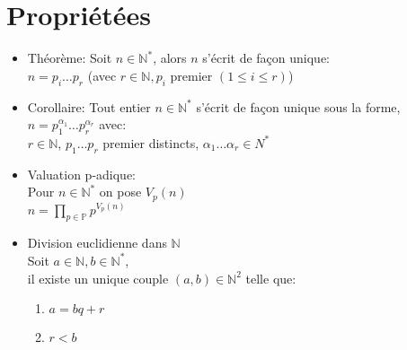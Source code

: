 \documentclass[fleqn]{article}
\begin{document}
\section{Propri\'et\'ees}
\begin{itemize}
	\item Th\'eor\`eme: Soit $n \in \mathbb{N}^*$, alors $n$ s'\'ecrit de fa\c{c}on unique: \\
		$n = p_i \ldots p_r$ (avec $r \in \mathbb{N}, p_i$ premier $(1 \leq i \leq r)$)
	\item Corollaire: Tout entier $n \in \mathbb{N}^*$ s'\'ecrit de fa\c{c}on unique sous la forme, \\
		$n = p_1^{\alpha_1} \ldots p_r^{\alpha_r}$ avec: \\
		$r \in \mathbb{N}$, $p_1 \ldots p_r$ premier distincts, $\alpha_1 \ldots \alpha_r \in {N}^*$
	\item Valuation p-adique: \\
		Pour $n \in \mathbb{N}^*$ on pose $V_p(n)$ \\
		$n = \prod_{p \in \mathbb{P}} p^{V_p(n)}$
	\item Division euclidienne dans $\mathbb{N}$ \\
		Soit $a \in \mathbb{N}, b \in \mathbb{N}^*$, \\
		il existe un unique couple $(a,b) \in \mathbb{N}^2$ telle que:
		\begin{enumerate}
			\item $a = bq + r$
			\item $r < b$
		\end{enumerate}
\end{itemize}
\end{document}
